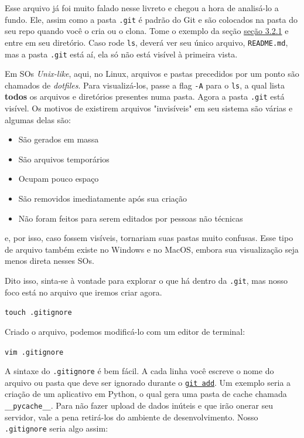 \documentclass{article}
\begin{document}
  Esse arquivo já foi muito falado nesse livreto e chegou a hora de analisá-lo a fundo. Ele, assim como a pasta \texttt{.git} 
  é padrão do Git e são colocados na pasta do seu repo quando você o cria ou o clona. Tome o exemplo da 
  seção \href{sec:clone}{seção 3.2.1} e entre em seu diretório. Caso rode \texttt{ls}, deverá ver seu único arquivo, 
  \texttt{README.md}, mas a pasta \texttt{.git} está aí, ela só não está visível à primeira vista.
  
  Em SOs \textit{Unix-like}, aqui, no Linux, arquivos e pastas precedidos por um ponto são chamados de \textit{dotfiles}.
  Para visualizá-los, passe a flag \texttt{-A} para o \texttt{ls}, a qual lista \textbf{todos} os arquivos e diretórios presentes numa pasta. 
  Agora a pasta \texttt{.git} está visível. Os motivos de existirem arquivos "invisíveis" em seu sistema são várias e algumas delas são:
  
  \begin{itemize}
	\item{São gerados em massa}
	\item{São arquivos temporários}
	\item{Ocupam pouco espaço}
	\item{São removidos imediatamente após sua criação}
	\item{Não foram feitos para serem editados por pessoas não técnicas}
  \end{itemize}

  e, por isso, caso fossem visíveis, tornariam suas pastas muito confusas. Esse tipo de arquivo também existe no 
  Windows e no MacOS, embora sua visualização seja menos direta nesses SOs. 
  
  Dito isso, sinta-se à vontade para explorar o que há dentro da \texttt{.git}, mas nosso foco está no arquivo que iremos criar
  agora.

  \vspace{1ex}
  \texttt{touch .gitignore}
  \vspace{1ex}

  Criado o arquivo, podemos modificá-lo com um editor de terminal:  

  \vspace{1ex}
  \texttt{vim .gitignore}
  \vspace{1ex}

  A sintaxe do \texttt{.gitignore} é bem fácil. A cada linha você escreve o nome do arquivo ou pasta que deve 
  ser ignorado durante o \href{sec:add}{\texttt{git add}}. Um exemplo seria a criação de um aplicativo em 
  Python, o qual gera uma pasta de cache chamada \texttt{\_\_pycache\_\_}. Para não fazer upload de dados inúteis e que 
  irão onerar seu servidor, vale a pena retirá-los do ambiente de desenvolvimento. Nosso \texttt{.gitignore} seria algo assim: 
\end{document}
